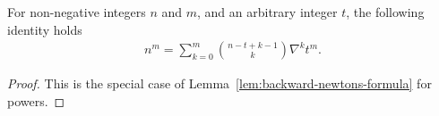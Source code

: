 \begin{lemma}
  \label{lem:backward-newtons-formula-for-powers}
  For non-negative integers $n$ and $m$, and an arbitrary integer $t$, the following identity holds
  \begin{align*}
    n^m = \sum_{k=0}^{m} \binom{n-t+k-1}{k} \nabla^{k} t^m.
  \end{align*}
  \begin{proof}
    This is the special case of Lemma~\eqref{lem:backward-newtons-formula} for powers.
  \end{proof}
\end{lemma}
